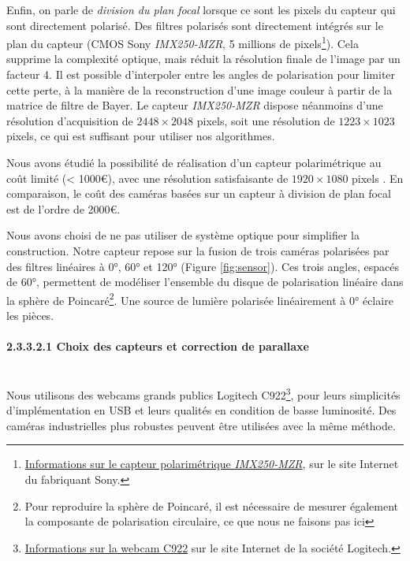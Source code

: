 Enfin, on parle de \textit{division du plan focal} lorsque ce sont les pixels du capteur qui sont directement polarisé.
Des filtres polarisés sont directement intégrés sur le plan du capteur \cite{yamazaki_fourdirectional_2016} (CMOS Sony \textit{IMX250-MZR}, 5 millions de pixels\footnote{\href{https://www.sony-semicon.co.jp/products_en/IS/sensor5/index.html}{Informations sur le capteur polarimétrique \textit{IMX250-MZR}}, sur le site Internet du fabriquant Sony.}).
Cela supprime la complexité optique, mais réduit la résolution finale de l'image par un facteur 4.
Il est possible d'interpoler entre les angles de polarisation pour limiter cette perte, à la manière de la reconstruction d'une image couleur à partir de la matrice de filtre de Bayer.
Le capteur \textit{IMX250-MZR} dispose néanmoins d'une résolution d'acquisition de $2448\times 2048$ pixels, soit une résolution  de $1223\times 1023$ pixels, ce qui est suffisant pour utiliser nos algorithmes.

Nous avons étudié la possibilité de réalisation d'un capteur polarimétrique au coût limité (< 1000€), avec une résolution satisfaisante de $1920\times 1080$ pixels \cite{nagorny_polarimetric_2019}.
En comparaison, le coût des caméras basées sur un capteur à division de plan focal est de l'ordre de 2000€.

Nous avons choisi de ne pas utiliser de système optique pour simplifier la construction.
Notre capteur repose sur la fusion de trois caméras polarisées par des filtres linéaires à 0°, 60° et 120° (Figure \ref{fig:sensor}).
Ces trois angles, espacés de 60°, permettent de modéliser l'ensemble du disque de polarisation linéaire dans la sphère de Poincaré\footnote{Pour reproduire la sphère de Poincaré, il est nécessaire de mesurer également la composante de polarisation circulaire, ce que nous ne faisons pas ici}.
Une source de lumière polarisée linéairement à 0° éclaire les pièces.


\paragraph{2.3.3.2.1 Choix des capteurs et correction de parallaxe}\mbox{} \\
Nous utilisons des webcams grands publics Logitech C922\footnote{\href{https://www.logitech.fr/fr-fr/product/c922-pro-stream-webcam}{Informations sur la webcam C922} sur le site Internet de la société Logitech.}, pour leurs simplicités d'implémentation en USB et leurs qualités en condition de basse luminosité.
Des caméras industrielles plus robustes peuvent être utilisées avec la même méthode.

